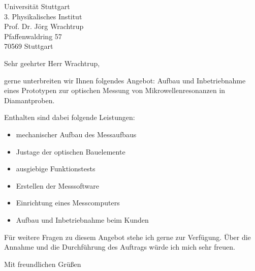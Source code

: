 \documentclass[DIN,
               paper=a4,
               fontsize=11pt,
               enlargefirstpage,
               foldmarks=on,
               pagenumber=off,
               firsthead=on,
               firstfoot=on,
               parskip=full,
               addrfield=on,
               fromalign=right,
               fromemail=true,
               fromphone=true,
               fromurl=true,
               fromlogo=on,
               fromrule=off,
               numericaldate=off,
              ]{scrlttr2}
\begin{document}




\begin{letter}{Universität Stuttgart\\
               3. Physikalisches Institut\\
               Prof. Dr. Jörg Wrachtrup\\               
               Pfaffenwaldring 57\\
               70569 Stuttgart}
               
\opening{Sehr geehrter Herr Wrachtrup,}
gerne unterbreiten wir Ihnen folgendes Angebot:
Aufbau und Inbetriebnahme eines Prototypen zur optischen Messung
von Mikrowellenresonanzen in Diamantproben.

Enthalten sind dabei folgende Leistungen:
\begin{itemize}
  \item mechanischer Aufbau des Messaufbaus
  \item Justage der optischen Bauelemente
  \item ausgiebige Funktionstests
  \item Erstellen der Messsoftware
  \item Einrichtung eines Messcomputers
  \item Aufbau und Inbetriebnahme beim Kunden
\end{itemize}
Für weitere Fragen zu diesem Angebot stehe ich gerne zur Verfügung.
Über die Annahme und die Durchführung des Auftrags würde ich mich sehr freuen.


\closing{Mit freundlichen Grüßen}



\end{letter}
\end{document}
